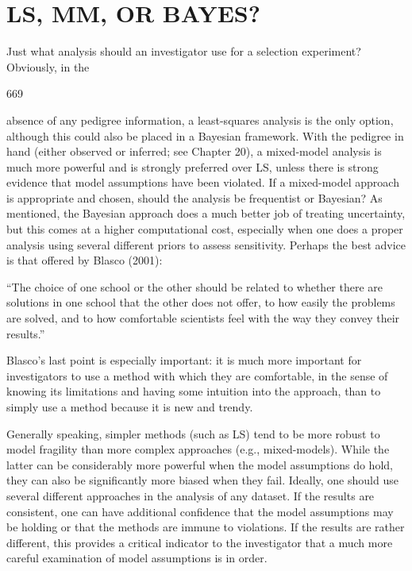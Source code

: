 \documentclass{article}
\begin{document}
\section{LS, MM, OR BAYES?}
Just what analysis should an investigator use for a selection experiment? Obviously, in the

669

absence of any pedigree information, a least-squares analysis is the only option, although this could also be placed in a Bayesian framework. With the pedigree in hand (either observed or inferred; see Chapter 20), a mixed-model analysis is much more powerful and is strongly preferred over LS, unless there is strong evidence that model assumptions have been violated. If a mixed-model approach is appropriate and chosen, should the analysis be frequentist or Bayesian? As mentioned, the Bayesian approach does a much better job of treating uncertainty, but this comes at a higher computational cost, especially when one does a proper analysis using several different priors to assess sensitivity. Perhaps the best advice is that offered by Blasco (2001):

“The choice of one school or the other should be related to whether there are solutions in one school that the other does not offer, to how easily the problems are solved, and to how comfortable scientists feel with the way they convey their results.”

Blasco's last point is especially important: it is much more important for investigators to use a method with which they are comfortable, in the sense of knowing its limitations and having some intuition into the approach, than to simply use a method because it is new and trendy.

Generally speaking, simpler methods (such as LS) tend to be more robust to model fragility than more complex approaches (e.g., mixed-models). While the latter can be considerably more powerful when the model assumptions do hold, they can also be significantly more biased when they fail. Ideally, one should use several different approaches in the analysis of any dataset. If the results are consistent, one can have additional confidence that the model assumptions may be holding or that the methods are immune to violations. If the results are rather different, this provides a critical indicator to the investigator that a much more careful examination of model assumptions is in order.
\end{document}
